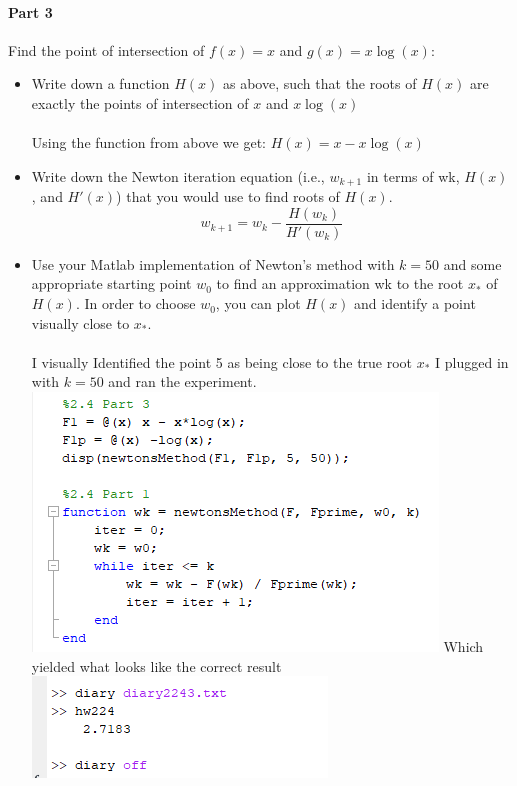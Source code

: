 \documentclass{article}
\begin{document}
\paragraph{Part 3}
Find the point of intersection of $f(x) = x$ and $g(x) = x \log(x)$:
\begin{itemize}
  \item Write down a function $H(x)$ as above, such that the roots of $H(x)$ are exactly the points of intersection of $x$ and $x \log(x)$
  \paragraph{}
  Using the function from above we get: $H(x) = x - x \log(x)$
  \item Write down the Newton iteration equation (i.e., $w_{k+1}$ in terms of wk, $H(x)$, and $H'(x)$) that you would use to find roots of $H(x)$.
  \[w_{k+1} = w_k - \frac{H(w_k)}{H'(w_k)}\]
  
  \item Use your Matlab implementation of Newton’s method with $k = 50$ and some appropriate starting point $w_0$ to find an approximation wk to the root $x_*$ of $H(x)$. In order to choose $w_0$, you can plot $H(x)$ and identify a point visually close to $x_*$.
  \paragraph{}
  I visually Identified the point 5 as being close to the true root $x_*$ I plugged in with $k=50$ and ran the experiment.
  \newline
  \includegraphics[]{Homework2/2.4.3code.png}
  \newline
  Which yielded what looks like the correct result
  \newline
  \includegraphics[]{Homework2/2.4.3diary.png}
  \newline
\end{itemize}
\end{document}
